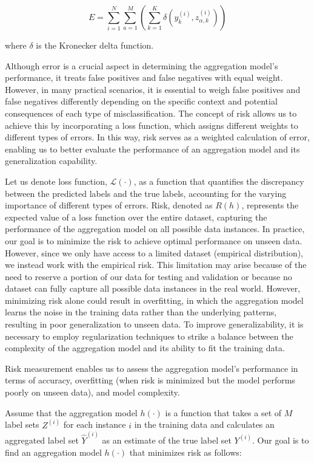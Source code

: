 \begin{equation}
E = \sum_{i=1}^N \sum_{a=1}^M \left( \sum_{k=1}^K \delta\left(y_k^{(i)}, z_{\alpha,k}^{(i)}\right) \right)
\label{crowd.Eq.1.risk.error}
\end{equation}

where $\delta $ is the Kronecker delta function.

Although error is a crucial aspect in determining the aggregation model's performance, it treats false positives and false negatives with equal weight. However, in many practical scenarios, it is essential to weigh false positives and false negatives differently depending on the specific context and potential consequences of each type of misclassification. The concept of risk allows us to achieve this by incorporating a loss function, which assigns different weights to different types of errors. In this way, risk serves as a weighted calculation of error, enabling us to better evaluate the performance of an aggregation model and its generalization capability.

Let us denote loss function, $\mathcal{L}(\cdot)$, as a function that quantifies the discrepancy between the predicted labels and the true labels, accounting for the varying importance of different types of errors.
Risk, denoted as $R(h) $, represents the expected value of a loss  function over the entire dataset, capturing the performance of the aggregation model on all possible data instances.  In practice, our goal is to minimize the risk to achieve optimal performance on unseen data. However, since we only have access to a limited dataset (empirical distribution), we instead work with the empirical risk. This limitation may arise because of the need to reserve a portion of our data for testing and validation or because no dataset can fully capture all possible data instances in the real world. However, minimizing risk alone could result in overfitting, in which the aggregation model learns the noise in the training data rather than the underlying patterns, resulting in poor generalization to unseen data. To improve generalizability, it is necessary to employ regularization techniques to strike a balance between the complexity of the aggregation model and its ability to fit the training data.

Risk measurement enables us to assess the aggregation model's performance in terms of accuracy, overfitting (when risk is minimized but the model performs poorly on unseen data), and model complexity.

Assume that the aggregation model $h (\cdot) $ is a function that takes a set of $M $ label sets $Z^{(i)} $ for each instance $i $ in the training data and calculates an aggregated label set $\widehat{Y}^{(i)} $ as an estimate of the true label set $Y^{(i)} $. Our goal is to find an aggregation model $h(\cdot) $ that minimizes risk as follows:

